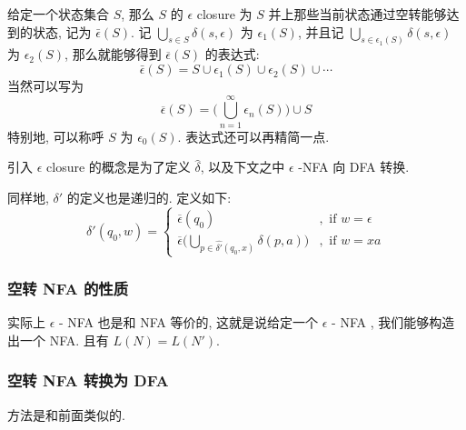 \documentclass[../main_part1.tex]{subfiles}
\begin{document}
\begin{exam}
\end{exam}

\begin{definition}
给定一个状态集合 \(S\), 那么 \(S\) 的 \(\epsilon\) closure 为 \(S\) 并上那些当前状态通过空转能够达到的状态, 记为 \(\bar{\epsilon} (S)\). 记 \(\bigcup_{s \in S} \delta (s , \epsilon ) \) 为 \(\epsilon _{1} (S)\), 并且记 \(\bigcup_{s \in \epsilon _{1} (S)} \delta (s, \epsilon )\) 为 \(\epsilon _{2} (S) \), 那么就能够得到 \(\overline{\epsilon} (S)\) 的表达式: 
\begin{equation}
\bar\epsilon (S) = S \cup \epsilon_{1} (S) \cup \epsilon_{2	} (S) \cup \cdots
\end{equation}
当然可以写为 
\begin{equation}
\overline{\epsilon} (S)  = \big(\bigcup_{n = 1} ^{ \infty}\epsilon_{n} (S) \big) \cup S
\end{equation}
特别地, 可以称呼 \(S\) 为 \(\epsilon_{0} (S)\). 表达式还可以再精简一点. 
\end{definition}

引入 \(\epsilon\) closure 的概念是为了定义 \(\hat{\delta}\), 以及下文之中 \(\epsilon\) -NFA 向 DFA 转换. 
\begin{definition}
同样地, \(\delta'\) 的定义也是递归的. 定义如下: 
\begin{equation}
\delta' (q_{0}, w) = 
\begin{cases}
\overline{\epsilon} (q_{0}) &, \text{ if } w = \epsilon \\
\overline{\epsilon} \big(\bigcup_{p\in \hat{\delta'}(q _{0}, x)} \delta (p,a)\big) &, \text{ if } w = xa
\end{cases}
\end{equation}
\end{definition}

\subsubsection{空转 NFA 的性质}
实际上 \(\epsilon\) - NFA 也是和 NFA 等价的, 这就是说给定一个 \(\epsilon\) - NFA , 我们能够构造出一个 NFA. 且有 \(L (N )  = L (N ' ) \). 
\begin{thm} 
\end{thm}
\subsubsection{空转 NFA 转换为 DFA}
方法是和前面类似的. %
\end{document}
